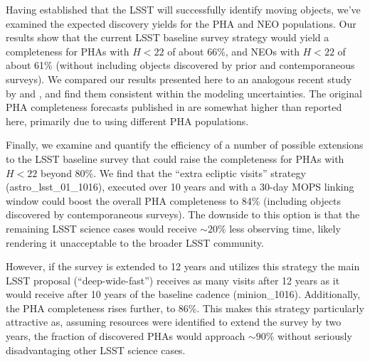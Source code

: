 
Having established that the LSST will successfully identify moving objects, we've examined the expected discovery yields for the PHA and NEO populations. Our results show that the current LSST baseline survey strategy would yield a completeness for PHAs with $H<22$ of about 66\%, and NEOs with $H<22$ of about 61\% (without including objects discovered by prior and contemporaneous surveys). We compared our results presented here to an analogous recent study by \citet[]{GMS2016} and \citet{VeresChesley2017neo}, and find them consistent within the modeling uncertainties. The original
PHA completeness forecasts published in \cite{LSSToverview} are somewhat higher than reported here, primarily due to using different PHA populations. 

Finally, we examine and quantify the efficiency of a number of possible extensions to the LSST baseline survey that could raise the
completeness for PHAs with $H<22$ beyond 80\%. We find that the ``extra ecliptic visits'' strategy (astro\_lsst\_01\_1016), executed over 10 years and with a 30-day MOPS linking window could boost the overall PHA completeness to 84\% (including objects discovered by contemporaneous surveys). The downside to this option is that the remaining LSST science cases would receive $\sim 20$\% less observing time, likely rendering it unacceptable to the broader LSST community.

However, if the survey is extended to 12 years and utilizes this strategy the main LSST proposal (``deep-wide-fast'') receives as many visits after 12 years as it would receive after 10 years of the
baseline cadence (minion\_1016). Additionally, the PHA completeness rises further, to 86\%. This makes this strategy particularly attractive as, assuming resources were identified to extend the survey by two years, the fraction of discovered PHAs would approach $\sim 90$\% without seriously disadvantaging other LSST science cases.

